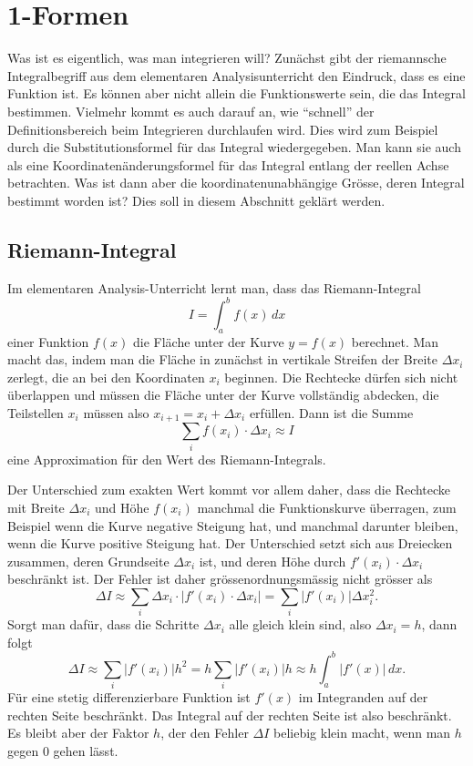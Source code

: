 %
%
\section{1-Formen}
%
Was ist es eigentlich, was man integrieren will?
Zunächst gibt der riemannsche Integralbegriff aus dem elementaren
Analysisunterricht den Eindruck, dass es eine Funktion ist.
%
Es können aber nicht allein die Funktionswerte sein, die das Integral
bestimmen.
Vielmehr kommt es auch darauf an, wie ``schnell'' der Definitionsbereich
beim Integrieren durchlaufen wird.
Dies wird zum Beispiel durch die Substitutionsformel für das Integral
wiedergegeben.
Man kann sie auch als eine Koordinatenänderungsformel für das Integral
entlang der reellen Achse betrachten.
Was ist dann aber die koordinatenunabhängige Grösse, deren Integral
bestimmt worden ist?
Dies soll in diesem Abschnitt geklärt werden.

%
%
\subsection{Riemann-Integral}
%
Im elementaren Analysis-Unterricht lernt man, dass das Riemann-Integral
\[
I
=
\int_a^b f(x)\,dx
\]
einer Funktion $f(x)$ die Fläche unter der Kurve $y=f(x)$ berechnet.
Man macht das, indem man die Fläche in zunächst in vertikale Streifen
der Breite $\Delta x_i$ zerlegt, die an bei den Koordinaten $x_i$
beginnen.
Die Rechtecke dürfen sich nicht überlappen und müssen die Fläche unter
der Kurve vollständig abdecken, die Teilstellen $x_i$ müssen
also $x_{i+1}=x_i+\Delta x_i$ erfüllen.
Dann ist die Summe
\begin{equation}
\sum_{i} f(x_i)\cdot \Delta x_i
\approx 
I
\label{buch:kurvenintegral:1-form:eqn:riemann-summe}
\end{equation}
eine Approximation für den Wert des Riemann-Integrals.

Der Unterschied zum exakten Wert kommt vor allem daher, dass die
Rechtecke mit Breite $\Delta x_i$ und Höhe $f(x_i)$ manchmal
die Funktionskurve überragen, zum Beispiel wenn die Kurve negative
Steigung hat, und manchmal darunter bleiben, wenn die Kurve positive
Steigung hat.
Der Unterschied setzt sich aus Dreiecken zusammen, deren Grundseite
$\Delta x_i$ ist, und deren Höhe durch $f'(x_i)\cdot \Delta x_i$
beschränkt ist.
Der Fehler ist daher grössenordnungsmässig nicht grösser als
\[
\Delta I
\approx
\sum_i \Delta x_i \cdot |f'(x_i)\cdot \Delta x_i|
=
\sum_i |f'(x_i)| \Delta x_i^2.
\]
Sorgt man dafür, dass die Schritte $\Delta x_i$ alle gleich klein
sind, also $\Delta x_i=h$, dann folgt
\[
\Delta I
\approx
\sum_i |f'(x_i)| h^2
=
h\sum_i |f'(x_i)|h
\approx
h\int_a^b |f'(x)|\,dx.
\]
Für eine stetig differenzierbare Funktion ist $f'(x)$ im Integranden
auf der rechten Seite beschränkt.
Das Integral auf der rechten Seite ist also beschränkt.
Es bleibt aber der Faktor $h$, der den Fehler $\Delta I$ beliebig
klein macht, wenn man $h$ gegen $0$ gehen lässt.


